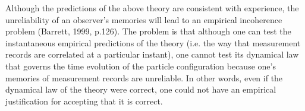 Although the predictions of the above theory are consistent with experience, the unreliability of an observer's memories will lead to an empirical incoherence problem (Barrett, 1999, p.126).
The problem is that although one can test the instantaneous empirical predictions of the theory (i.e. the way that measurement records are correlated at a particular instant), one cannot test its dynamical law that governs the time evolution of the particle configuration because one's memories of measurement records are unreliable.
In other words, even if the dynamical law of the theory were correct, one could not have an empirical justification for accepting that it is correct.








